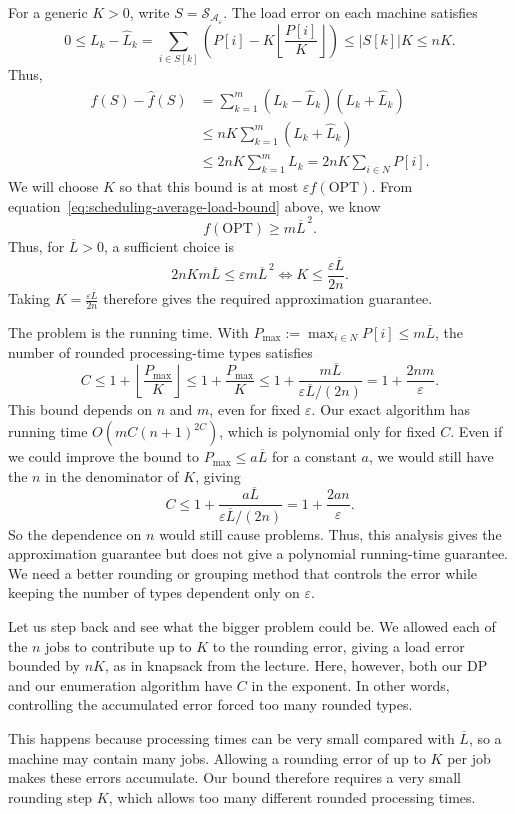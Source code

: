 \documentclass[12pt,a4paper]{article}
\theoremstyle{definition}
\theoremstyle{plain}
\begin{document}
For a generic $K>0$, write $S=\mathcal{S}_{\mathcal{A}_{\varepsilon}}$.
The load error on each machine satisfies
\[
0\leq L_k-\widehat{L}_k
=\sum_{i\in S[k]}\left(P[i]-K\left\lfloor\frac{P[i]}{K}\right\rfloor\right)
\leq |S[k]|K\leq nK.
\]
Thus,
\[
\begin{aligned}
f(S)-\widehat{f}(S)
&=\sum_{k=1}^{m}(L_k-\widehat{L}_k)(L_k+\widehat{L}_k)\\
&\leq nK\sum_{k=1}^{m}(L_k+\widehat{L}_k)\\
&\leq 2nK\sum_{k=1}^{m}L_k
=2nK\sum_{i\in N}P[i].
\end{aligned}
\]
We will choose $K$ so that this bound is at most $\varepsilon f(\mathrm{OPT})$.
From equation~\eqref{eq:scheduling-average-load-bound} above, we know
\[
f(\mathrm{OPT})\geq m\overline{L}^{\,2}.
\]
Thus, for $\overline{L}>0$, a sufficient choice is
\[
2nKm\overline{L}\leq\varepsilon m\overline{L}^{\,2}
\iff K\leq\frac{\varepsilon\overline{L}}{2n}.
\]
Taking $K=\frac{\varepsilon\overline{L}}{2n}$ therefore gives the required
approximation guarantee.

The problem is the running time. With
$P_{\max}:=\max_{i\in N}P[i]\leq m\overline{L}$,
the number of rounded processing-time types satisfies
\[
C\leq1+\left\lfloor\frac{P_{\max}}{K}\right\rfloor
\leq1+\frac{P_{\max}}{K}
\leq1+\frac{m\overline{L}}{\varepsilon\overline{L}/(2n)}
=1+\frac{2nm}{\varepsilon}.
\]
This bound depends on $n$ and $m$, even for fixed $\varepsilon$.
Our exact algorithm has running time $O(mC(n+1)^{2C})$, which is
polynomial only for fixed $C$. Even if we could improve the bound to
$P_{\max}\leq a\overline{L}$ for a constant $a$, we would still have
the $n$ in the denominator of $K$, giving
\[
C\leq1+\frac{a\overline{L}}{\varepsilon\overline{L}/(2n)}
=1+\frac{2an}{\varepsilon}.
\]
So the dependence on $n$ would still cause problems.
Thus, this analysis gives the approximation
guarantee but does not give a polynomial running-time guarantee.
We need a better rounding or grouping method that controls the error
while keeping the number of types dependent only on $\varepsilon$.

Let us step back and see what the bigger problem could be. We allowed
each of the $n$ jobs to contribute up to $K$ to the rounding error, giving
a load error bounded by $nK$, as in knapsack from the lecture. Here,
however, both our DP and our enumeration algorithm have $C$ in the exponent.
In other words, controlling
the accumulated error forced too many rounded types.

This happens because processing times can be very small compared with
$\overline{L}$, so a machine may contain many jobs. Allowing a rounding
error of up to $K$ per job makes these errors accumulate. Our bound
therefore requires a very small rounding step $K$, which allows too many
different rounded processing times.
\end{document}
